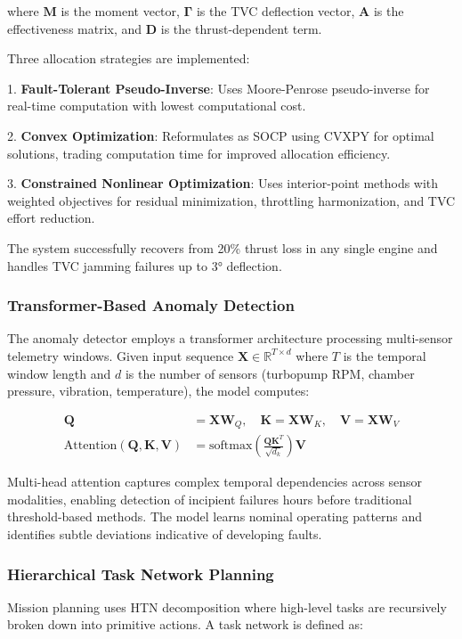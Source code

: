 \documentclass[10pt, conference, compsocconf]{IEEEtran}
\begin{document}
where $\mathbf{M}$ is the moment vector, $\boldsymbol{\Gamma}$ is the TVC deflection vector, $\mathbf{A}$ is the effectiveness matrix, and $\mathbf{D}$ is the thrust-dependent term\cite{mdpiftca}.

Three allocation strategies are implemented:

1. \textbf{Fault-Tolerant Pseudo-Inverse}: Uses Moore-Penrose pseudo-inverse for real-time computation with lowest computational cost.

2. \textbf{Convex Optimization}: Reformulates as SOCP using CVXPY for optimal solutions, trading computation time for improved allocation efficiency.

3. \textbf{Constrained Nonlinear Optimization}: Uses interior-point methods with weighted objectives for residual minimization, throttling harmonization, and TVC effort reduction.

The system successfully recovers from 20\% thrust loss in any single engine and handles TVC jamming failures up to 3° deflection\cite{mdpiftca}.

\subsubsection{Transformer-Based Anomaly Detection}
The anomaly detector employs a transformer architecture processing multi-sensor telemetry windows\cite{lee2019deep}. Given input sequence $\mathbf{X} \in \mathbb{R}^{T \times d}$ where $T$ is the temporal window length and $d$ is the number of sensors (turbopump RPM, chamber pressure, vibration, temperature), the model computes:

\begin{align}
\mathbf{Q} &= \mathbf{X}\mathbf{W}_Q, \quad \mathbf{K} = \mathbf{X}\mathbf{W}_K, \quad \mathbf{V} = \mathbf{X}\mathbf{W}_V \\
\text{Attention}(\mathbf{Q}, \mathbf{K}, \mathbf{V}) &= \text{softmax}\left(\frac{\mathbf{Q}\mathbf{K}^T}{\sqrt{d_k}}\right)\mathbf{V}
\end{align}

Multi-head attention captures complex temporal dependencies across sensor modalities, enabling detection of incipient failures hours before traditional threshold-based methods\cite{lee2019deep}. The model learns nominal operating patterns and identifies subtle deviations indicative of developing faults.

\subsubsection{Hierarchical Task Network Planning}
Mission planning uses HTN decomposition where high-level tasks are recursively broken down into primitive actions\cite{zhang2024spacecraft}. A task network is defined as:
\end{document}
